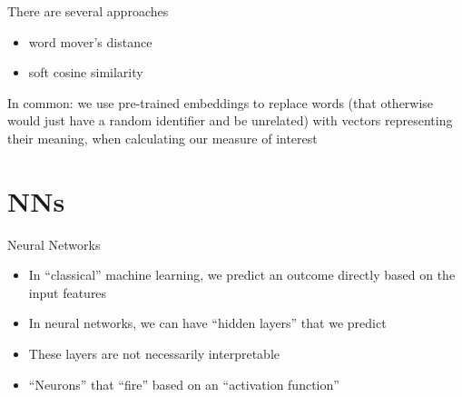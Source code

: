 \documentclass[compress]{beamer}
\begin{document}
\begin{frame}{There are several approaches}
	\begin{itemize}
		\item word mover's distance
		\item soft cosine similarity
	\end{itemize}
	In common: we use pre-trained embeddings to replace words (that otherwise would just have a random identifier and be unrelated) with vectors representing their meaning, when calculating our measure of interest
\end{frame}

\section{NNs}

\begin{frame}{Neural Networks}
	\begin{itemize}
		\item In ``classical'' machine learning, we predict an outcome directly based on the input features
		\item In neural networks, we can have ``hidden layers'' that we predict
		\item These layers are not necessarily interpretable
		\item ``Neurons'' that ``fire'' based on an ``activation function''
	\end{itemize}
	
\end{frame}
\end{document}
